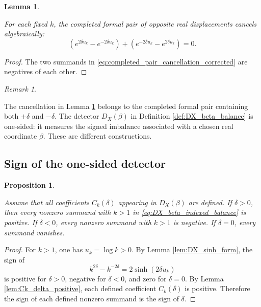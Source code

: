 \documentclass[11pt]{amsart}
\numberwithin{equation}{section}
\theoremstyle{plain}
\newtheorem{proposition}[theorem]{Proposition}
\newtheorem{lemma}[theorem]{Lemma}
\theoremstyle{definition}
\theoremstyle{remark}
\newtheorem{remark}[theorem]{Remark}
\begin{document}
\begin{lemma}
\label{lem:completed_pair_cancellation_corrected}

For each fixed \(k\), the completed formal pair of opposite real displacements cancels algebraically:
\begin{equation}
\left(e^{2\delta u_k}-e^{-2\delta u_k}\right)
+
\left(e^{-2\delta u_k}-e^{2\delta u_k}\right)
=
0.
\label{eq:completed_pair_cancellation_corrected}
\end{equation}

\end{lemma}

\begin{proof}
The two summands in \eqref{eq:completed_pair_cancellation_corrected} are negatives of each other.
\end{proof}

\begin{remark}
\label{rem:completed_pair_not_one_sided_detector}

The cancellation in Lemma \ref{lem:completed_pair_cancellation_corrected} belongs to the completed formal pair containing both \(+\delta\) and \(-\delta\).  The detector \(D_X(\beta)\) in Definition \ref{def:DX_beta_balance} is one-sided: it measures the signed imbalance associated with a chosen real coordinate \(\beta\).  These are different constructions.

\end{remark}

\subsection{Sign of the one-sided detector}
\label{subsec:sign_one_sided_detector}

\begin{proposition}
\label{prop:DX_sign_detector}

Assume that all coefficients \(C_k(\delta)\) appearing in \(D_X(\beta)\) are defined.  If \(\delta>0\), then every nonzero summand with \(k>1\) in \eqref{eq:DX_beta_indexed_balance} is positive.  If \(\delta<0\), every nonzero summand with \(k>1\) is negative.  If \(\delta=0\), every summand vanishes.

\end{proposition}

\begin{proof}
For \(k>1\), one has \(u_k=\log k>0\).  By Lemma \ref{lem:DX_sinh_form}, the sign of
\begin{equation}
k^{2\delta}-k^{-2\delta}
=
2\sinh(2\delta u_k)
\label{eq:sign_detector_sinh}
\end{equation}
is positive for \(\delta>0\), negative for \(\delta<0\), and zero for \(\delta=0\).  By Lemma \ref{lem:Ck_delta_positive}, each defined coefficient \(C_k(\delta)
\) is positive.  Therefore the sign of each defined nonzero summand is the sign of \(\delta\).
\end{proof}
\end{document}
